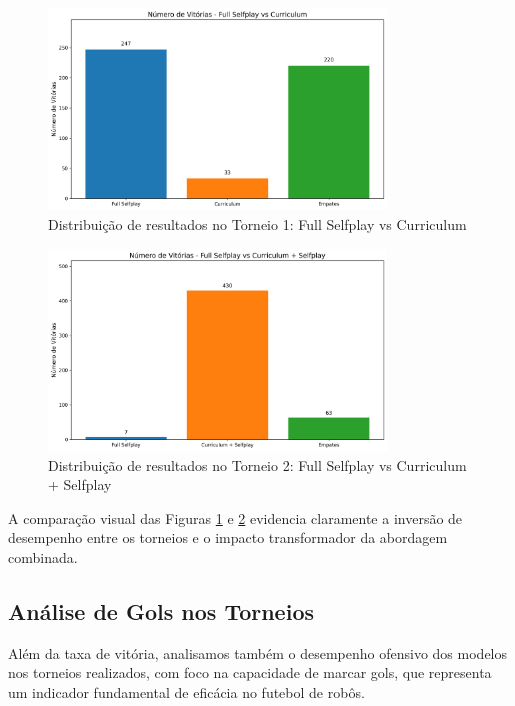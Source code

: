 \begin{figure}[H]
    \centering
    \includegraphics[width=0.8\textwidth]{fig/graficos_trabalho/graficos_torneios/torneios/vitorias_full_selfplay_vs_curriculum.png}
    \caption{Distribuição de resultados no Torneio 1: Full Selfplay vs Curriculum}
    \label{fig:vitorias_torneio1}
\end{figure}

\begin{figure}[H]
    \centering
    \includegraphics[width=0.8\textwidth]{fig/graficos_trabalho/graficos_torneios/torneios/vitorias_full_selfplay_vs_curriculum_+_selfplay.png}
    \caption{Distribuição de resultados no Torneio 2: Full Selfplay vs Curriculum + Selfplay}
    \label{fig:vitorias_torneio2}
\end{figure}

A comparação visual das Figuras \ref{fig:vitorias_torneio1} e \ref{fig:vitorias_torneio2} evidencia claramente a inversão de desempenho entre os torneios e o impacto transformador da abordagem combinada.

\subsection{Análise de Gols nos Torneios}

Além da taxa de vitória, analisamos também o desempenho ofensivo dos modelos nos torneios realizados, com foco na capacidade de marcar gols, que representa um indicador fundamental de eficácia no futebol de robôs.

